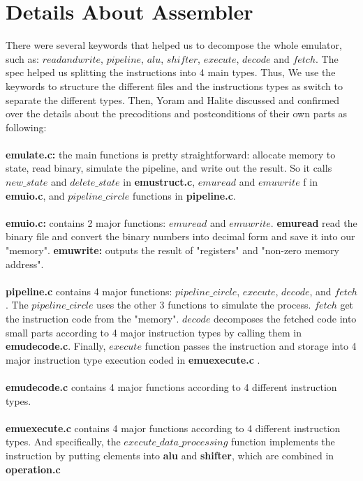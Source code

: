 \documentclass[a4paper]{article}
\begin{document}
\newpage



\section{Details About Assembler}
There were several keywords that helped us to decompose the whole emulator, such as: $read and write$, $pipeline$, $alu$, $shifter$, $execute$, $decode$ and $fetch$. The spec helped us splitting the instructions into 4 main types. Thus, We use the keywords to structure the different files and the instructions types as switch to separate the different types. Then, Yoram and Halite discussed and confirmed over the details about the precoditions and postconditions of their own parts as following:
\\\\
\textbf{emulate.c:} the main functions is pretty straightforward: allocate memory to state, read binary, simulate the pipeline, and write out the result. So it calls $new\_state$ and $delete\_state$ in \textbf{emustruct.c}, $emuread$ and $emuwrite$ f in \textbf{emuio.c}, and $pipeline\_circle$ functions in \textbf{pipeline.c}.
\\\\
\textbf{emuio.c:} contains 2 major functions: $emuread$ and $emuwrite$. \textbf{emuread} read the binary file and convert the binary numbers into decimal form and save it into our "memory".
\textbf{emuwrite:} outputs the result of "registers" and "non-zero memory address".
\\\\
\textbf{pipeline.c} contains 4 major functions: $pipeline\_circle$, $execute$, $decode$, and $fetch$. The $pipeline\_circle$ uses the other 3 functions to simulate the process. $fetch$ get the instruction code from the "memory". $decode$ decomposes the fetched code into small parts according to 4 major instruction types by calling them in \textbf{emudecode.c}. Finally, $execute$ function passes the instruction and storage into 4 major instruction type execution coded in \textbf{emuexecute.c} .
\\\\
\textbf{emudecode.c} contains 4 major functions according to 4 different instruction types.
\\\\
\textbf{emuexecute.c} contains 4 major functions according to 4 different instruction types. And specifically, the $execute\_data\_processing$ function implements the instruction by putting elements into \textbf{alu} and \textbf{shifter}, which are combined in \textbf{operation.c}\\
\end{document}
